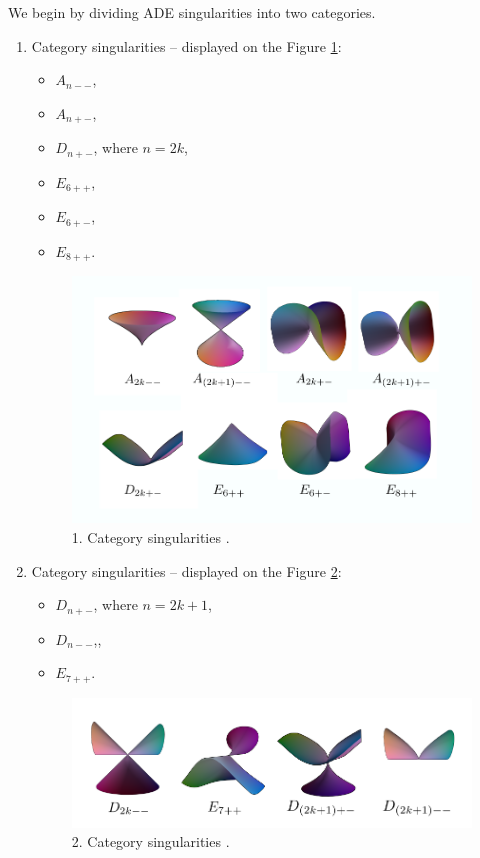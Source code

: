 We begin by dividing ADE singularities into two categories.
\begin{enumerate}
    \item Category singularities -- displayed on the Figure \ref{img:42}:
    \begin{itemize}
        \item $A_{n--}$,
        \item $A_{n+-}$,
        \item $D_{n+-}$, where $n=2k$,
        \item $E_{6++}$, 
        \item $E_{6+-}$,
        \item $E_{8++}$.
    \end{itemize}
    \begin{figure}
        \centerline{\includegraphics[scale=0.5]{images/img42}}
        \caption[1. Category singualrities]
        {1. Category singularities \cite{morris2003client}.}
        \label{img:42}
    \end{figure}
    \item Category singularities -- displayed on the Figure \ref{img:43}:
    \begin{itemize}
        \item $D_{n+-}$, where $n=2k+1$,
        \item $D_{n--}$,,
        \item $E_{7++}$.
    \end{itemize}
    \begin{figure}
        \centerline{\includegraphics[scale=0.5]{images/img43}}
        \caption[2. Category singularities]
        {2. Category singularities \cite{morris2003client}.}
        \label{img:43}
    \end{figure}
\end{enumerate}


